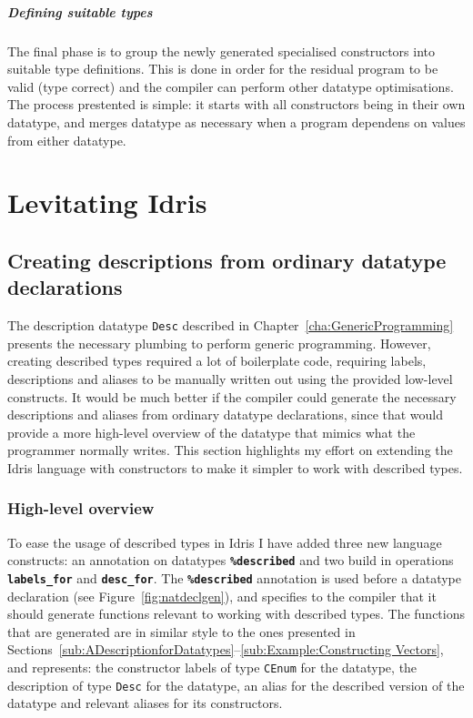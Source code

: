 \documentclass{ituthesis}
\newcommand{\tttype}[1]{\textcolor{type-color}{\texttt{#1}}}
\theoremstyle{break}
\begin{document}
\paragraph{Defining suitable types}
\label{par:Defining suitable types}
The final phase is to group the newly generated specialised constructors into suitable type definitions.
This is done in order for the residual program to be valid (type correct) and the compiler can perform other datatype optimisations.
The process prestented is simple: it starts with all constructors being in their own datatype, and merges datatype as necessary when a program dependens on values from either datatype.

\chapter{Levitating Idris}
\label{cha:LevitatingIdris}

\section{Creating descriptions from ordinary datatype declarations}
\label{sec:Creating descriptions from ordinary data declarations}
The description datatype \tttype{Desc} described in Chapter~\ref{cha:GenericProgramming} presents the necessary plumbing to perform generic programming.
However, creating described types required a lot of boilerplate code, requiring labels, descriptions and aliases to be manually written out using the provided low-level constructs.
It would be much better if the compiler could generate the necessary descriptions and aliases from ordinary datatype declarations, since that would provide a more high-level overview of the datatype that mimics what the programmer normally writes.
This section highlights my effort on extending the Idris language with constructors to make it simpler to work with described types.

\subsection{High-level overview}
\label{sub:High-level overview}
To ease the usage of described types in Idris I have added three new language constructs: an annotation on datatypes \texttt{\textbf{\%described}} and two build in operations \texttt{\textbf{labels\_for}} and \texttt{\textbf{desc\_for}}.
The \texttt{\textbf{\%described}} annotation is used before a datatype declaration (see Figure~\ref{fig:natdeclgen}), and specifies to the compiler that it should generate functions relevant to working with described types.
The functions that are generated are in similar style to the ones presented in Sections~\ref{sub:ADescriptionforDatatypes}--\ref{sub:Example:Constructing Vectors}, and represents: the constructor labels of type \tttype{CEnum} for the datatype, the description of type \tttype{Desc} for the datatype, an alias for the described version of the datatype and relevant aliases for its constructors.
\end{document}
